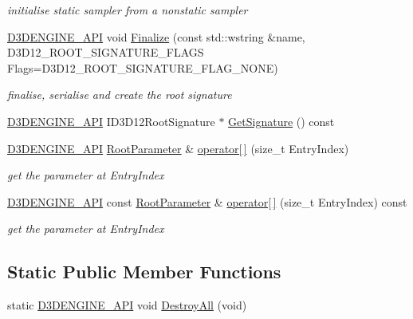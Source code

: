 \begin{DoxyCompactItemize}
\begin{DoxyCompactList}\small\item\em initialise static sampler from a nonstatic sampler \end{DoxyCompactList}\item 
\mbox{\hyperlink{stdafx_8h_a8ee2d990c5dfba7794dd2b60741d7722}{D3\+D\+E\+N\+G\+I\+N\+E\+\_\+\+A\+PI}} void \mbox{\hyperlink{class_root_signature_add0b5d37697d4677e544b64a20d7f814}{Finalize}} (const std\+::wstring \&name, D3\+D12\+\_\+\+R\+O\+O\+T\+\_\+\+S\+I\+G\+N\+A\+T\+U\+R\+E\+\_\+\+F\+L\+A\+GS Flags=D3\+D12\+\_\+\+R\+O\+O\+T\+\_\+\+S\+I\+G\+N\+A\+T\+U\+R\+E\+\_\+\+F\+L\+A\+G\+\_\+\+N\+O\+NE)
\begin{DoxyCompactList}\small\item\em finalise, serialise and create the root signature \end{DoxyCompactList}\item 
\mbox{\hyperlink{stdafx_8h_a8ee2d990c5dfba7794dd2b60741d7722}{D3\+D\+E\+N\+G\+I\+N\+E\+\_\+\+A\+PI}} I\+D3\+D12\+Root\+Signature $\ast$ \mbox{\hyperlink{class_root_signature_abc18852457af7517045e3d7f66be1aad}{Get\+Signature}} () const
\item 
\mbox{\hyperlink{stdafx_8h_a8ee2d990c5dfba7794dd2b60741d7722}{D3\+D\+E\+N\+G\+I\+N\+E\+\_\+\+A\+PI}} \mbox{\hyperlink{class_root_parameter}{Root\+Parameter}} \& \mbox{\hyperlink{class_root_signature_a95aadb8281dab5f2175605e72997377e}{operator\mbox{[}$\,$\mbox{]}}} (size\+\_\+t Entry\+Index)
\begin{DoxyCompactList}\small\item\em get the parameter at Entry\+Index \end{DoxyCompactList}\item 
\mbox{\hyperlink{stdafx_8h_a8ee2d990c5dfba7794dd2b60741d7722}{D3\+D\+E\+N\+G\+I\+N\+E\+\_\+\+A\+PI}} const \mbox{\hyperlink{class_root_parameter}{Root\+Parameter}} \& \mbox{\hyperlink{class_root_signature_a699105d59c405303de3ccfa03e7c4ff3}{operator\mbox{[}$\,$\mbox{]}}} (size\+\_\+t Entry\+Index) const
\begin{DoxyCompactList}\small\item\em get the parameter at Entry\+Index \end{DoxyCompactList}\end{DoxyCompactItemize}
\subsection*{Static Public Member Functions}
\begin{DoxyCompactItemize}
\item 
static \mbox{\hyperlink{stdafx_8h_a8ee2d990c5dfba7794dd2b60741d7722}{D3\+D\+E\+N\+G\+I\+N\+E\+\_\+\+A\+PI}} void \mbox{\hyperlink{class_root_signature_a9dbe7dee4131ab004588a9b5805373fb}{Destroy\+All}} (void)
\end{DoxyCompactItemize}
